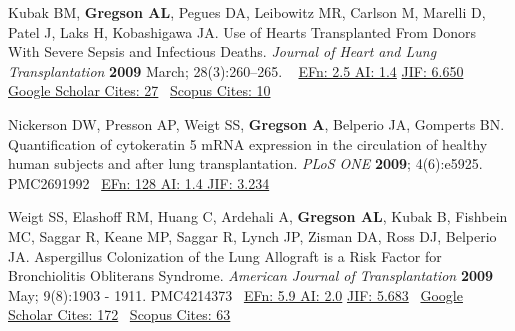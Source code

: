 \documentclass[letterpaper,10pt,sans,dvipsnames,final]{moderncv}%
\begin{document}
\begin{thebibliography}{1}
 \bibitem[9]{} Kubak BM, \textbf{Gregson AL}, Pegues DA, Leibowitz MR, Carlson M, Marelli D, Patel J, Laks H, Kobashigawa JA. Use of Hearts Transplanted From Donors With Severe Sepsis and Infectious Deaths. {\color{BrickRed}\textit{Journal of Heart and Lung Transplantation}} \textbf{2009} March; 28(3):260--265. \href{http://dx.doi.org/10.1016/j.healun.2008.11.911}{\aiDoi}~
    {\color{NavyBlue} \href{http://www.eigenfactor.org/rankings.php?search=JOURNAL+OF+HEART+AND+LUNG+TRANSPLANTATION&search2=&search3=&searchby=journal}{{\smaller EFn: 2.5 AI: 1.4}}
       \href{http://admin-apps.webofknowledge.com/JCR/JCR?RQ=RECORD&rank=1&journal=J+HEART+LUNG+TRANSPL}{{\smaller JIF: 6.650}}~
     \href{http://scholar.google.com/scholar?cites=7343380594284811327&as_sdt=2005&sciodt=0,5&hl=en}{{\smaller Google Scholar Cites: 27}}~
     \href{http://www.scopus.com/record/display.url?eid=2-s2.0-61749102272&origin=inward&txGid=2728424DD3A06399B3857C04F09A7B4B.N5T5nM1aaTEF8rE6yKCR3A%3a21}{{\smaller Scopus Cites: 10}}
     }

 \bibitem[10]{} Nickerson DW, Presson AP, Weigt SS, \textbf{Gregson A}, Belperio JA, Gomperts BN. Quantification of cytokeratin 5 mRNA expression in the circulation of healthy human subjects and after lung transplantation. {\color{BrickRed}\textit{PLoS {\smaller ONE}}} \textbf{2009}; 4(6):e5925. \href{http://www.plosone.org/article/info%3Adoi%2F10.1371%2Fjournal.pone.0005925}{\aiDoi} {\smaller PMC2691992}~ 
     {\color{NavyBlue} \href{http://admin-apps.isiknowledge.com/JCR/JCR?RQ=RECORD&rank=6&journal=PLOS+ONE}{{\smaller EFn: 128 AI: 1.4 JIF: 3.234}}~ 
     }

 \bibitem[11]{} Weigt SS, Elashoff RM, Huang C, Ardehali A, \textbf{Gregson AL}, Kubak B, Fishbein MC, Saggar R, Keane MP, Saggar R,  Lynch JP, Zisman DA, Ross DJ, Belperio JA. Aspergillus Colonization of the Lung Allograft is a Risk Factor for Bronchiolitis Obliterans Syndrome. {\color{BrickRed}\textit{American Journal of Transplantation}} \textbf{2009} May; 9(8):1903 - 1911. \href{http://dx.doi.org/10.1111/j.1600-6143.2009.02635.x}{\aiDoi} {\smaller PMC4214373}~ 
           {\color{NavyBlue}\href{http://52.6.43.8/projects/journalRank/rankings.php?bsearch=AMERICAN+JOURNAL+OF+TRANSPLANTATION&searchby=journal&orderby=eigenfactor}{{\smaller EFn: 5.9 AI: 2.0}} 
       \href{http://admin-apps.webofknowledge.com/JCR/JCR?RQ=RECORD&rank=1&journal=AM+J+TRANSPLANT}{{\smaller JIF: 5.683}}~
       \href{http://scholar.google.com/scholar?cites=2622793820022300316&as_sdt=2005&sciodt=0,5&hl=en}{{\smaller Google Scholar Cites: 172}}~
       \href{http://www.scopus.com/record/display.url?eid=2-s2.0-67650954171&origin=inward&txGid=2728424DD3A06399B3857C04F09A7B4B.N5T5nM1aaTEF8rE6yKCR3A%3a18}{{\smaller Scopus Cites: 63}}
       }


\end{thebibliography}
\end{document}
